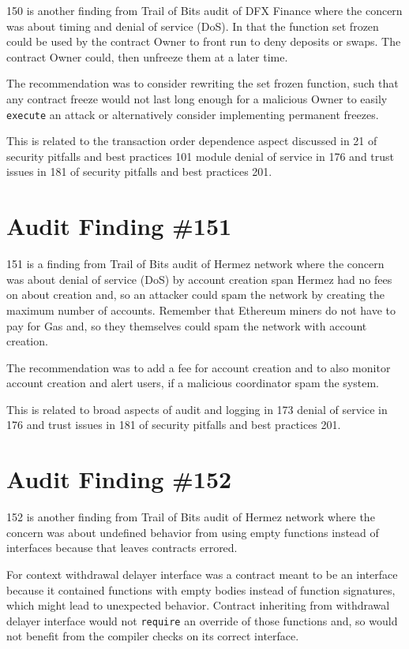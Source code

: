 150 is another finding from Trail of Bits audit of DFX Finance where the concern was about timing and denial of service (DoS). In that the function set frozen could be used by the contract Owner to front run to deny deposits or swaps. The contract Owner could, then unfreeze them at a later time.

The recommendation was to consider rewriting the set frozen function, such that any contract freeze would not last long enough for a malicious Owner to easily \verb|execute| an attack or alternatively consider implementing permanent freezes.

This is related to the transaction order dependence aspect discussed in 21 of security pitfalls and best practices 101 module denial of service in 176 and trust issues in 181 of security pitfalls and best practices 201.

\section{Audit Finding \#151}

151 is a finding from Trail of Bits audit of Hermez network where the concern was about denial of service (DoS) by account creation span Hermez had no fees on about creation and, so an attacker could spam the network by creating the maximum number of accounts. Remember that Ethereum miners do not have to pay for Gas and, so they themselves could spam the network with account creation.

The recommendation was to add a fee for account creation and to also monitor account creation and alert users, if a malicious coordinator spam the system.

This is related to broad aspects of audit and logging in 173 denial of service in 176 and trust issues in 181 of security pitfalls and best practices 201.

\section{Audit Finding \#152}

152 is another finding from Trail of Bits audit of Hermez network where the concern was about undefined behavior from using empty functions instead of interfaces because that leaves contracts errored. 

For context withdrawal delayer interface was a contract meant to be an interface because it contained functions with empty bodies instead of function signatures, which might lead to unexpected behavior. Contract inheriting from withdrawal delayer interface would not \verb|require| an override of those functions and, so would not benefit from the compiler checks on its correct interface.

